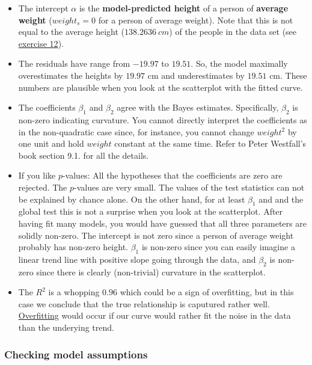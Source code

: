 \documentclass[
]{book}
\providecommand{\tightlist}{%
  \setlength{\itemsep}{0pt}\setlength{\parskip}{0pt}}
\begin{document}
\begin{itemize}
\tightlist
\item
  The intercept \(\alpha\) is the \textbf{model-predicted height} of a person of \textbf{average weight}
  (\(weight_s=0\) for a person of average weight).
  Note that this is not equal to the average height (\(138.2636~cm\)) of the people in the data set
  (see \hyperref[exercise12_multiple_regression]{exercise 12}).
\item
  The residuals have range from \(-19.97\) to \(19.51\). So, the model maximally
  overestimates the heights by \(19.97\) cm and underestimates by \(19.51\) cm.
  These numbers are plausible when you look at the scatterplot with the fitted
  curve.
\item
  The coefficients \(\beta_1\) and \(\beta_2\) agree with the Bayes estimates.
  Specifically, \(\beta_2\) is non-zero indicating curvature. You cannot directly interpret the coefficients
  as in the non-quadratic case since, for instance, you cannot change \(weight^2\) by one unit
  and hold \(weight\) constant at the same time. Refer to Peter Westfall's book section 9.1. for all the details.
\item
  If you like \(p\)-values: All the hypotheses that the coefficients are zero
  are rejected. The \(p\)-values are very small. The values of the test statistics can not be explained
  by chance alone. On the other hand, for at least \(\beta_1\) and
  and the global test this is not a surprise when you look at the scatterplot.
  After having fit many models, you would have guessed that all three parameters
  are solidly non-zero. The intercept is not zero since a person of average weight probably
  has non-zero height. \(\beta_1\) is non-zero since you can easily imagine a linear
  trend line with positive slope going through the data, and \(\beta_2\) is non-zero
  since there is clearly (non-trivial) curvature in the scatterplot.
\item
  The \(R^2\) is a whopping \(0.96\) which could be a sign of overfitting, but
  in this case we conclude that the true relationship is caputured rather well.
  \href{https://en.wikipedia.org/wiki/Overfitting}{Overfitting} would occur if
  our curve would rather fit the noise in the data than
  the underying trend.
\end{itemize}

\subsubsection{Checking model assumptions}\label{checking-model-assumptions}
\end{document}
